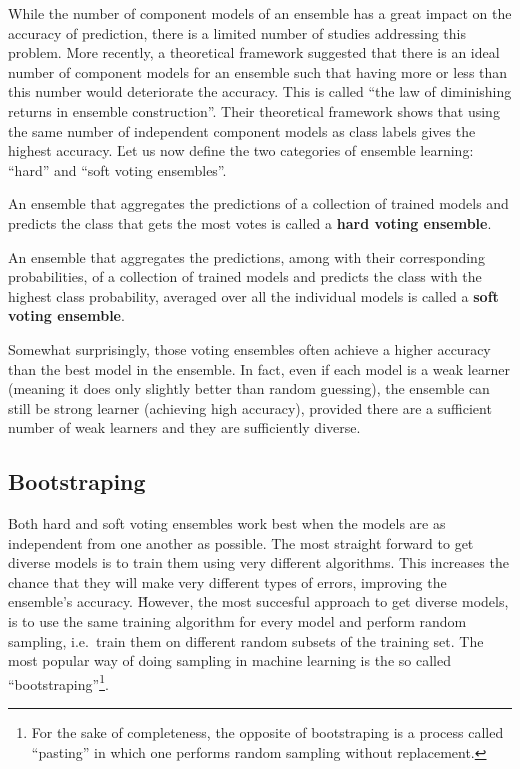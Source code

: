 While the number of component models of an ensemble has a great impact on the accuracy of prediction, there is a
limited number of studies addressing this problem. More recently, a theoretical framework suggested that there is an
ideal number of component models for an ensemble such that having more or less than this number  would deteriorate
the accuracy. This is called ``the law of diminishing returns in ensemble construction''. Their theoretical
framework shows that using the same number of independent component models as class labels gives the highest
accuracy. \v

Let us now define the two categories of ensemble learning: ``hard'' and ``soft voting ensembles''.

An ensemble that aggregates the predictions of a collection of trained models and predicts the class that gets the most
votes is called a \textbf{hard voting ensemble}.
\ed

An ensemble that aggregates the predictions, among with their corresponding probabilities, of a collection of trained
models and predicts the class with the highest class probability, averaged over all the individual models is called a
\textbf{soft voting ensemble}.
\ed


Somewhat surprisingly, those voting ensembles often achieve a higher accuracy than the best model in the ensemble.
In fact, even if each model is a weak learner (meaning it does only slightly better than random guessing), the
ensemble can still be strong learner (achieving high accuracy), provided there are a sufficient number of weak
learners and they are sufficiently diverse.

\subsection{Bootstraping}

Both hard and soft voting ensembles work best when the models are as independent from one another as possible. The
most straight forward to get diverse models is to train them using very different algorithms. This increases the
chance that they will make very different types of errors, improving the ensemble's accuracy. \v

However, the most succesful approach to get diverse models, is to use the same training algorithm for every model
and perform random sampling, i.e.\ train them on different random subsets of the training set. The most popular way
of doing sampling in machine learning is the so called ``bootstraping''\footnote{For the sake of completeness, the
opposite of bootstraping is a process called ``pasting'' in which one performs random sampling without replacement.}.

